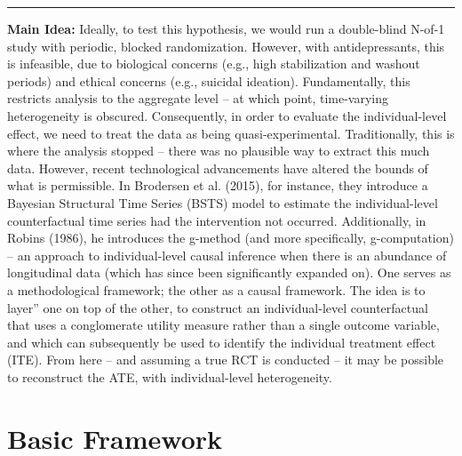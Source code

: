 \documentclass[12pt,letterpaper,doublespace, oneside]{article}
\begin{document}
\noindent\rule{\linewidth}{0.4pt}

\noindent



\noindent\textbf{Main Idea:}
Ideally, to test this hypothesis, we would run a double-blind N-of-1 study with periodic, blocked randomization. However, with antidepressants, this is infeasible, due to biological concerns (e.g., high stabilization and washout periods) and ethical concerns (e.g., suicidal ideation). Fundamentally, this restricts analysis to the aggregate level -- at which point, time-varying heterogeneity is obscured. Consequently, in order to evaluate the individual-level effect, we need to treat the data as being quasi-experimental. Traditionally, this is where the analysis stopped -- there was no plausible way to extract this much data. However, recent technological advancements have altered the bounds of what is permissible. In Brodersen et al. (2015), for instance, they introduce a Bayesian Structural Time Series (BSTS) model to estimate the individual-level counterfactual time series had the intervention not occurred. Additionally, in Robins (1986), he introduces the g-method (and more specifically, g-computation) -- an approach to individual-level causal inference when there is an abundance of longitudinal data (which has since been significantly expanded on). One serves as a methodological framework; the other as a causal framework. The idea is to layer'' one on top of the other, to construct an individual-level counterfactual that uses a conglomerate utility measure rather than a single outcome variable, and which can subsequently be used to identify the individual treatment effect (ITE). From here -- and assuming a true RCT is conducted -- it may be possible to reconstruct the ATE, with individual-level heterogeneity. 


\newpage
\section{Basic Framework}
\end{document}

